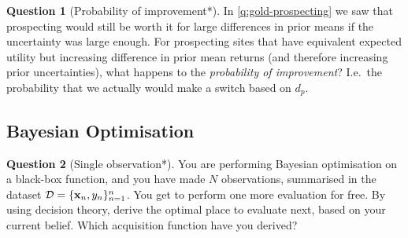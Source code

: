 \documentclass[a4paper]{article}
\theoremstyle{definition}
\newtheorem{question}{Question}
\begin{document}
\begin{question}[Probability of improvement*]
\label{q:prob-improv}
In \cref{q:gold-prospecting} we saw that prospecting would still be worth it for large differences in prior means if the uncertainty was large enough. For prospecting sites that have equivalent expected utility but increasing difference in prior mean returns (and therefore increasing prior uncertainties), what happens to the \emph{probability of improvement}? I.e.~the probability that we actually would make a switch based on $d_p$.
\end{question}


\subsection{Bayesian Optimisation}
\begin{question}[Single observation*]
\label{q:single-obs-bo}
You are performing Bayesian optimisation on a black-box function, and you have made $N$ observations, summarised in the dataset $\mathcal{D} = \{\mathbf{x}_n, y_n\}_{n=1}^n$. You get to perform one more evaluation for free. By using decision theory, derive the optimal place to evaluate next, based on your current belief. Which acquisition function have you derived?
\end{question}
\end{document}
